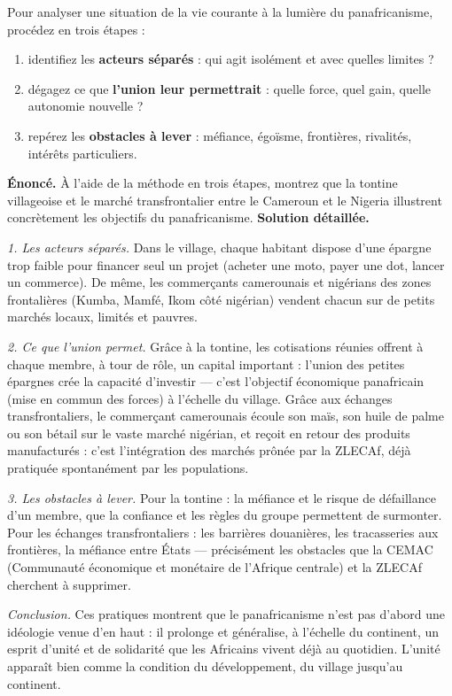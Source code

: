 \documentclass[11pt]{article}
\begin{document}
\begin{methode}
Pour analyser une situation de la vie courante à la lumière du panafricanisme, procédez en trois étapes :
\begin{enumerate}
\item identifiez les \textbf{acteurs séparés} : qui agit isolément et avec quelles limites ?
\item dégagez ce que \textbf{l'union leur permettrait} : quelle force, quel gain, quelle autonomie nouvelle ?
\item repérez les \textbf{obstacles à lever} : méfiance, égoïsme, frontières, rivalités, intérêts particuliers.
\end{enumerate}
\end{methode}

\begin{exoresolu}
\textbf{Énoncé.} À l'aide de la méthode en trois étapes, montrez que la tontine villageoise et le marché transfrontalier entre le Cameroun et le Nigeria illustrent concrètement les objectifs du panafricanisme.
\tcblower
\textbf{Solution détaillée.}

\emph{1. Les acteurs séparés.} Dans le village, chaque habitant dispose d'une épargne trop faible pour financer seul un projet (acheter une moto, payer une dot, lancer un commerce). De même, les commerçants camerounais et nigérians des zones frontalières (Kumba, Mamfé, Ikom côté nigérian) vendent chacun sur de petits marchés locaux, limités et pauvres.

\emph{2. Ce que l'union permet.} Grâce à la tontine, les cotisations réunies offrent à chaque membre, à tour de rôle, un capital important : l'union des petites épargnes crée la capacité d'investir — c'est l'objectif économique panafricain (mise en commun des forces) à l'échelle du village. Grâce aux échanges transfrontaliers, le commerçant camerounais écoule son maïs, son huile de palme ou son bétail sur le vaste marché nigérian, et reçoit en retour des produits manufacturés : c'est l'intégration des marchés prônée par la ZLECAf, déjà pratiquée spontanément par les populations.

\emph{3. Les obstacles à lever.} Pour la tontine : la méfiance et le risque de défaillance d'un membre, que la confiance et les règles du groupe permettent de surmonter. Pour les échanges transfrontaliers : les barrières douanières, les tracasseries aux frontières, la méfiance entre États — précisément les obstacles que la CEMAC (Communauté économique et monétaire de l'Afrique centrale) et la ZLECAf cherchent à supprimer.

\emph{Conclusion.} Ces pratiques montrent que le panafricanisme n'est pas d'abord une idéologie venue d'en haut : il prolonge et généralise, à l'échelle du continent, un esprit d'unité et de solidarité que les Africains vivent déjà au quotidien. L'unité apparaît bien comme la condition du développement, du village jusqu'au continent.
\end{exoresolu}
\end{document}
